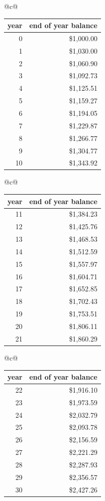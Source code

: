 \begin{sol}
\begin{center}
\begin{tabular}[t]{@{}c@{}}
\footnotesize\setlength{\tabcolsep}{4pt}
\begin{tabular}[t]{rr}
\hline
\textbf{year} & \textbf{end of year balance} \\
\hline
0 & \$1,000.00 \\
1 & \$1,030.00 \\
2 & \$1,060.90 \\
3 & \$1,092.73 \\
4 & \$1,125.51 \\
5 & \$1,159.27 \\
6 & \$1,194.05 \\
7 & \$1,229.87 \\
8 & \$1,266.77 \\
9 & \$1,304.77 \\
10 & \$1,343.92 \\
\hline
\end{tabular}
\end{tabular}
\qquad
\begin{tabular}[t]{@{}c@{}}
\footnotesize\setlength{\tabcolsep}{4pt}
\begin{tabular}[t]{rr}
\hline
\textbf{year} & \textbf{end of year balance} \\
\hline
11 & \$1,384.23 \\
12 & \$1,425.76 \\
13 & \$1,468.53 \\
14 & \$1,512.59 \\
15 & \$1,557.97 \\
16 & \$1,604.71 \\
17 & \$1,652.85 \\
18 & \$1,702.43 \\
19 & \$1,753.51 \\
20 & \$1,806.11 \\
21 & \$1,860.29 \\
\hline
\end{tabular}
\end{tabular}
\qquad
\begin{tabular}[t]{@{}c@{}}
\footnotesize\setlength{\tabcolsep}{4pt}
\begin{tabular}[t]{rr}
\hline
\textbf{year} & \textbf{end of year balance} \\
\hline
22 & \$1,916.10 \\
23 & \$1,973.59 \\
24 & \$2,032.79 \\
25 & \$2,093.78 \\
26 & \$2,156.59 \\
27 & \$2,221.29 \\
28 & \$2,287.93 \\
29 & \$2,356.57 \\
30 & \$2,427.26 \\
\hline
\end{tabular}
\end{tabular}
\end{center}




\end{sol}
